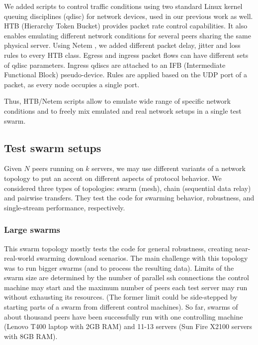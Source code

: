 \documentclass[conference]{IEEEtran}
\begin{document}
We added scripts to control traffic conditions using two standard Linux kernel queuing disciplines (qdisc) for network devices, used in our previous work \cite{perala} as well.
HTB (Hierarchy Token Bucket) \cite{devera:htb} provides packet rate
control capabilities. It also enables emulating different network conditions for several peers sharing the same physical server.
Using Netem \cite{netem}, we added different packet delay, jitter
and loss rules to every HTB class.
Egress and ingress packet flows can have different sets of qdisc
parameters. Ingress qdiscs are attached to an IFB (Intermediate
Functional Block) pseudo-device. Rules are applied based on the UDP port of a packet, as every node occupies a single port.

Thus, HTB/Netem scripts allow to emulate wide range of specific network conditions and to freely mix emulated and real network setups in a single test swarm.

\subsection{Test swarm setups}

Given $N$ peers running on $k$ servers, we may use different variants of a network topology to put an accent on different aspects of protocol behavior.
We considered three types of topologies: swarm (mesh), chain (sequential data relay) and pairwise transfers. They test the code for swarming behavior, robustness, and single-stream performance, respectively.


\subsubsection{Large swarms}

This swarm topology mostly tests the code for general robustness, creating near-real-world swarming download scenarios. The main challenge with this topology was to run bigger swarms (and to process the resulting data).
Limits of the swarm size are determined by the number of parallel ssh
connections the control machine may start and the maximum number
of peers each test server may run without exhausting its
resources. (The former limit could be side-stepped by starting parts
of a swarm from different control machines). So far, swarms of about thousand peers have been successfully run with one controlling machine (Lenovo T400 laptop with 2GB RAM) and 11-13 servers (Sun Fire X2100 servers with 8GB RAM).
\end{document}
